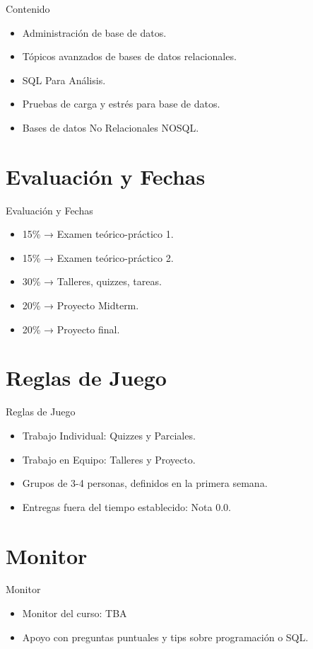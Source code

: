 \documentclass{beamer}
\begin{document}
\begin{frame}{Contenido}
\begin{itemize}
    \item Administración de base de datos.
    \item Tópicos avanzados de bases de datos relacionales.
    \item SQL Para Análisis.
    \item Pruebas de carga y estrés para base de datos.
    \item Bases de datos No Relacionales NOSQL.
\end{itemize}
\end{frame}

\section{Evaluación y Fechas}

\begin{frame}{Evaluación y Fechas}
    \begin{itemize}
        \item 15\% → Examen teórico-práctico 1.
        \item 15\% → Examen teórico-práctico 2.
        \item 30\% → Talleres, quizzes, tareas.
        \item 20\% → Proyecto Midterm.
        \item 20\% → Proyecto final.
    \end{itemize}
\end{frame}

\section{Reglas de Juego}

\begin{frame}{Reglas de Juego}
\begin{itemize}
    \item Trabajo Individual: Quizzes y Parciales.
    \item Trabajo en Equipo: Talleres y Proyecto.
    \item Grupos de 3-4 personas, definidos en la primera semana.
    \item Entregas fuera del tiempo establecido: Nota 0.0.
\end{itemize}
\end{frame}

\section{Monitor}

\begin{frame}{Monitor}
    \begin{itemize}
        \item Monitor del curso: TBA
        \item Apoyo con preguntas puntuales y tips sobre programación o SQL.
    \end{itemize}
\end{frame}
\end{document}
